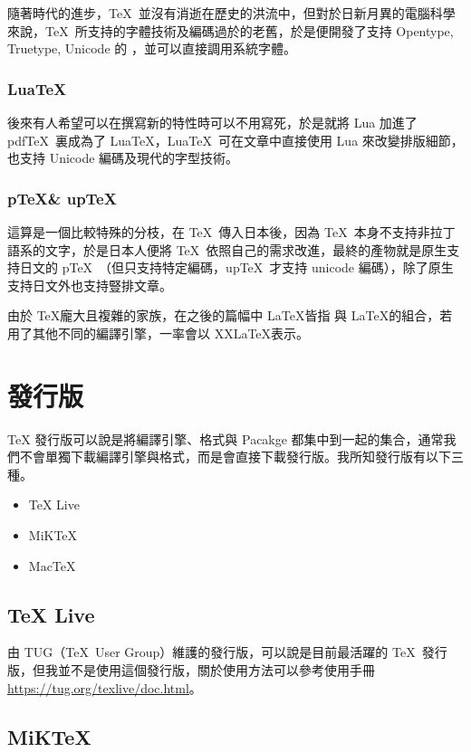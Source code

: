 隨著時代的進步，\TeX\ 並沒有消逝在歷史的洪流中，但對於日新月異的電腦科學來說，\TeX\ 所支持的字體技術及編碼過於的老舊，於是便開發了支持 Opentype, Truetype, Unicode 的 \XeTeX ，並可以直接調用系統字體。

\subsubsection{Lua\TeX}

後來有人希望可以在撰寫新的特性時可以不用寫死，於是就將 Lua 加進了 pdf\TeX\ 裏成為了 Lua\TeX ，Lua\TeX\ 可在文章中直接使用 Lua 來改變排版細節，也支持 Unicode 編碼及現代的字型技術。

\subsubsection{p\TeX \& up\TeX}

這算是一個比較特殊的分枝，在 \TeX\ 傳入日本後，因為 \TeX\ 本身不支持非拉丁語系的文字，於是日本人便將 \TeX\ 依照自己的需求改進，最終的產物就是原生支持日文的 p\TeX\ （但只支持特定編碼，up\TeX\ 才支持 unicode 編碼），除了原生支持日文外也支持豎排文章。

由於 \TeX 龐大且複雜的家族，在之後的篇幅中 \LaTeX 皆指 \XeTeX 與 \LaTeX 的組合，若用了其他不同的編譯引擎，一率會以 XX\LaTeX 表示。

\section{發行版}

TeX 發行版可以說是將編譯引擎、格式與 Pacakge 都集中到一起的集合，通常我們不會單獨下載編譯引擎與格式，而是會直接下載發行版。我所知發行版有以下三種。

\begin{itemize}
\item TeX Live
\item MiKTeX
\item MacTeX
\end{itemize}

\subsection{TeX Live}

由 TUG（\TeX\ User Group）維護的發行版，可以說是目前最活躍的 \TeX\ 發行版，但我並不是使用這個發行版，關於使用方法可以參考使用手冊 \url{https://tug.org/texlive/doc.html}。

\subsection{MiKTeX}


